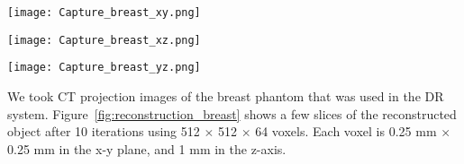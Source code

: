\begin{figure*}
	\begin{minipage}{0.3\linewidth}
		\texttt{[image: Capture\_breast\_xy.png]}
		\subcaption{}
	\end{minipage}
	\vspace{0.3cm}
	\begin{minipage}{0.3\linewidth}
		\texttt{[image: Capture\_breast\_xz.png]}
		\subcaption{}
	\end{minipage}
	\vspace{0.3cm}
	\begin{minipage}{0.3\linewidth}
		\texttt{[image: Capture\_breast\_yz.png]}
		\subcaption{}
	\end{minipage}
\caption{A slice of the reconstructed phantom in the (a) x-y plane (b) x-z plane, and (c) y-z plane, calculated using 512 $\times$ 512 $\times$ 64 voxels after 10 iterations, where each voxel size is 0.25 mm $\times$ 0.25 mm $\times$ 1 mm in the x, y, and z direction.}
\label{fig:reconstruction_breast}
\end{figure*}

We took CT projection images of the breast phantom that was used in the DR system.  Figure~\ref{fig:reconstruction_breast} shows a few slices of the reconstructed object after 10 iterations using 512 $\times$ 512 $\times$ 64 voxels.  Each voxel is 0.25 mm $\times$ 0.25 mm in the x-y plane, and 1 mm in the z-axis.

